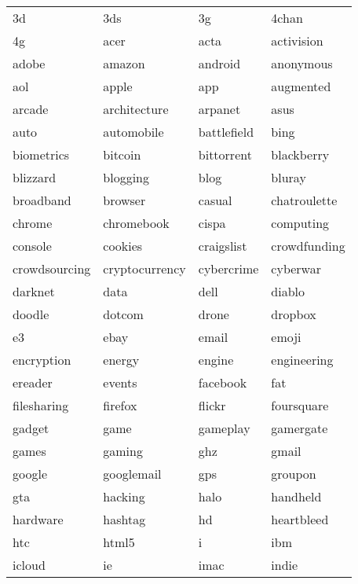\documentclass[12pt,a4paper]{report}
\begin{document}
\begin{tabular}{l|l|l|l}
3d & 3ds & 3g & 4chan\\
4g & acer & acta & activision\\
adobe & amazon & android & anonymous\\
aol & apple & app & augmented\\
arcade & architecture & arpanet & asus\\
auto & automobile & battlefield & bing\\
biometrics & bitcoin & bittorrent & blackberry\\
blizzard & blogging & blog & bluray\\
broadband & browser & casual & chatroulette\\
chrome & chromebook & cispa & computing\\
console & cookies & craigslist & crowdfunding\\
crowdsourcing & cryptocurrency & cybercrime & cyberwar\\
darknet & data & dell & diablo\\
doodle & dotcom & drone & dropbox\\
e3 & ebay & email & emoji\\
encryption & energy & engine & engineering\\
ereader & events & facebook & fat\\
filesharing & firefox & flickr & foursquare\\
gadget & game & gameplay & gamergate\\
games & gaming & ghz & gmail\\
google & googlemail & gps & groupon\\
gta & hacking & halo & handheld\\
hardware & hashtag & hd & heartbleed\\
htc & html5 & i & ibm\\
icloud & ie & imac & indie\\

\end{tabular}
\newpage
\end{document}
